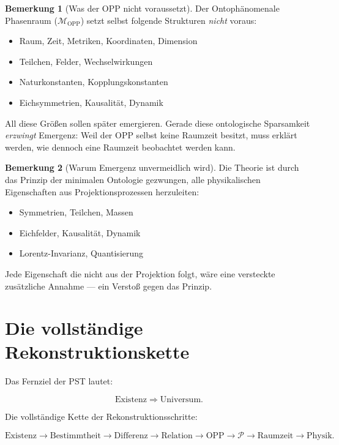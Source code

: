 \documentclass[11pt,a4paper]{article}
\theoremstyle{plain}
\theoremstyle{definition}
\newtheorem{remark}{Bemerkung}[section]
\begin{document}
\begin{remark}[Was der OPP nicht voraussetzt]
Der Ontoph\"{a}nomenale Phasenraum ($\mathcal{M}_{\text{OPP}}$) setzt
selbst folgende Strukturen \emph{nicht} voraus:
\begin{itemize}
  \item Raum, Zeit, Metriken, Koordinaten, Dimension
  \item Teilchen, Felder, Wechselwirkungen
  \item Naturkonstanten, Kopplungskonstanten
  \item Eichsymmetrien, Kausalit\"{a}t, Dynamik
\end{itemize}
All diese Gr\"{o}\ss{}en sollen sp\"{a}ter emergieren. Gerade diese
ontologische Sparsamkeit \emph{erzwingt} Emergenz: Weil der OPP selbst
keine Raumzeit besitzt, muss erkl\"{a}rt werden, wie dennoch eine Raumzeit
beobachtet werden kann.
\end{remark}

\begin{remark}[Warum Emergenz unvermeidlich wird]
Die Theorie ist durch das Prinzip der minimalen Ontologie gezwungen, alle
physikalischen Eigenschaften aus Projektionsprozessen herzuleiten:
\begin{itemize}
  \item Symmetrien, Teilchen, Massen
  \item Eichfelder, Kausalit\"{a}t, Dynamik
  \item Lorentz-Invarianz, Quantisierung
\end{itemize}
Jede Eigenschaft die nicht aus der Projektion folgt, w\"{a}re eine
versteckte zus\"{a}tzliche Annahme --- ein Versto\ss{} gegen das Prinzip.
\end{remark}

\section{Die vollst\"{a}ndige Rekonstruktionskette}

Das Fernziel der PST lautet:

\[
  \boxed{\text{Existenz} \;\Longrightarrow\; \text{Universum.}}
\]

Die vollst\"{a}ndige Kette der Rekonstruktionsschritte:

\[
  \text{Existenz}
  \rightarrow
  \text{Bestimmtheit}
  \rightarrow
  \text{Differenz}
  \rightarrow
  \text{Relation}
  \rightarrow
  \text{OPP}
  \rightarrow
  \mathcal{P}
  \rightarrow
  \text{Raumzeit}
  \rightarrow
  \text{Physik.}
\]
\end{document}
